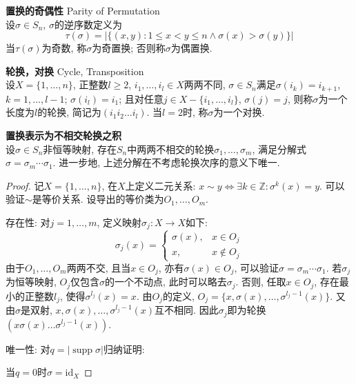 \begin{dfn}\textbf{置换的奇偶性} Parity of Permutation\\
设$\sigma \in S_n$, $\sigma$的逆序数定义为
\begin{equation*}
    \tau(\sigma) = \vert \{(x,y) : 1\le x<y \le n \land \sigma(x)> \sigma(y)\} \vert
\end{equation*}
当$\tau(\sigma)$为奇数, 称$\sigma$为奇置换; 否则称$\sigma$为偶置换. 
\end{dfn}

\begin{dfn}\textbf{轮换，对换} Cycle, Transposition\\
设$X=\{1,\dots,n\}$, 正整数$l\ge 2$, $i_1,\dots,i_l\in X$两两不同, $\sigma \in S_n$满足$\sigma(i_k) = i_{k+1}$, $k=1,\dots,l-1$; $\sigma(i_l)=i_1$; 且对任意$j \in X - \{i_1,\dots,i_l\}$, $\sigma(j)=j$, 则称$\sigma$为一个长度为$l$的轮换, 简记为$(i_1 i_2 \dots i_l)$. 当$l=2$时, 称$\sigma$为一个对换. 
\end{dfn}

\begin{pro}\textbf{置换表示为不相交轮换之积}\\
设$\sigma\in S_n$非恒等映射, 存在$S_n$中两两不相交的轮换$\sigma_1,\dots,\sigma_m$, 满足分解式$\sigma=\sigma_m \cdots \sigma_1$. 进一步地, 上述分解在不考虑轮换次序的意义下唯一. 
\end{pro}
\begin{proof}
记$X=\{1,\dots,n\}$, 在$X$上定义二元关系: $x\sim y \iff \exists k\in \mathbb{Z}: \sigma^k(x)=y$. 可以验证$\sim$是等价关系. 设导出的等价类为$O_1,\dots,O_m$. 

存在性: 对$j=1,\dots, m$, 定义映射$\sigma_j: X\to X$如下:
\begin{equation*}
    \sigma_j(x) = \begin{cases}
    \sigma(x), &x \in O_j\\
    x, &x \notin O_j
    \end{cases}
\end{equation*}
由于$O_1,\dots,O_m$两两不交, 且当$x\in O_j$, 亦有$\sigma(x) \in O_j$, 可以验证$\sigma = \sigma_m \cdots \sigma_1$. 若$\sigma_j$为恒等映射, $O_j$仅包含$\sigma$的一个不动点, 此时可以略去$\sigma_j$. 否则, 任取$x\in O_j$, 存在最小的正整数$l_j$, 使得$\sigma^{l_j}(x)=x$. 由$O_j$的定义, $O_j=\{x, \sigma(x), \dots, \sigma^{l_j-1}(x)\}$. 又由$\sigma$是双射, $x, \sigma(x), \dots, \sigma^{l_j-1}(x)$互不相同. 因此$\sigma_j$即为轮换$(x \sigma(x) \dots \sigma^{l_j-1}(x))$. 

唯一性: 对$q=|\operatorname{supp} \sigma|$归纳证明: 

当$q=0$时$\sigma=\mathrm{id}_X$ 
\end{proof}

